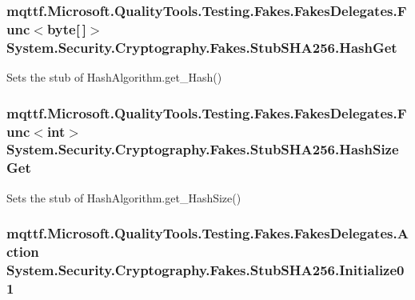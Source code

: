 \hypertarget{class_system_1_1_security_1_1_cryptography_1_1_fakes_1_1_stub_s_h_a256_a01b954e24185cd79234ad36c182626e3}{
\subsubsection[{Hash\-Get}]{\setlength{\rightskip}{0pt plus 5cm}mqttf.\-Microsoft.\-Quality\-Tools.\-Testing.\-Fakes.\-Fakes\-Delegates.\-Func$<$byte\mbox{[}$\,$\mbox{]}$>$ System.\-Security.\-Cryptography.\-Fakes.\-Stub\-S\-H\-A256.\-Hash\-Get}}\label{class_system_1_1_security_1_1_cryptography_1_1_fakes_1_1_stub_s_h_a256_a01b954e24185cd79234ad36c182626e3}


Sets the stub of Hash\-Algorithm.\-get\-\_\-\-Hash()

\hypertarget{class_system_1_1_security_1_1_cryptography_1_1_fakes_1_1_stub_s_h_a256_a924c255573685c9572c7e2831c51203d}{
\subsubsection[{Hash\-Size\-Get}]{\setlength{\rightskip}{0pt plus 5cm}mqttf.\-Microsoft.\-Quality\-Tools.\-Testing.\-Fakes.\-Fakes\-Delegates.\-Func$<$int$>$ System.\-Security.\-Cryptography.\-Fakes.\-Stub\-S\-H\-A256.\-Hash\-Size\-Get}}\label{class_system_1_1_security_1_1_cryptography_1_1_fakes_1_1_stub_s_h_a256_a924c255573685c9572c7e2831c51203d}


Sets the stub of Hash\-Algorithm.\-get\-\_\-\-Hash\-Size()

\hypertarget{class_system_1_1_security_1_1_cryptography_1_1_fakes_1_1_stub_s_h_a256_ad22258d66336e3d2e0fcf3eb74634a5d}{
\subsubsection[{Initialize01}]{\setlength{\rightskip}{0pt plus 5cm}mqttf.\-Microsoft.\-Quality\-Tools.\-Testing.\-Fakes.\-Fakes\-Delegates.\-Action System.\-Security.\-Cryptography.\-Fakes.\-Stub\-S\-H\-A256.\-Initialize01}}\label{class_system_1_1_security_1_1_cryptography_1_1_fakes_1_1_stub_s_h_a256_ad22258d66336e3d2e0fcf3eb74634a5d}


